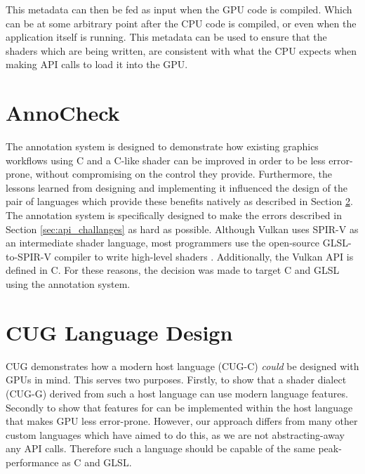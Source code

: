 \documentclass[a4paper,12pt,twoside,openright]{report}
\begin{document}
This metadata can then be fed as input when the GPU code is compiled. Which can
be at some arbitrary point after the CPU code is compiled, or even when the
application itself is running. This metadata can be used to ensure that the
shaders which are being written, are consistent with what the CPU expects when
making API calls to load it into the GPU.

\section{AnnoCheck}

\label{sec:design_annotation_processor}

The annotation system is designed to demonstrate how existing graphics
workflows using C and a C-like shader can be improved in order to be less
error-prone, without compromising on the control they provide. Furthermore, the
lessons learned from designing and implementing it influenced the design of the
pair of languages which provide these benefits natively as described in Section
\ref{sec:design_languages}. The annotation system is specifically designed to
make the errors described in Section \ref{sec:api_challanges} as hard as
possible. Although Vulkan uses SPIR-V as an intermediate shader language, most
programmers use the open-source GLSL-to-SPIR-V compiler to write high-level
shaders \cite{TODO}. Additionally, the Vulkan API is defined in C. For these
reasons, the decision was made to target C and GLSL using the annotation
system.


\section{CUG Language Design}

\label{sec:design_languages}

CUG demonstrates how a modern host language (CUG-C) \textit{could} be designed
with GPUs in mind. This serves two purposes. Firstly, to show that a shader
dialect (CUG-G) derived from such a host language can use modern language
features. Secondly to show that features for can be implemented within the host
language that makes GPU less error-prone. However, our approach differs from
many other custom languages which have aimed to do this, as we are not
abstracting-away any API calls. Therefore such a language should be capable of
the same peak-performance as C and GLSL.
\end{document}
